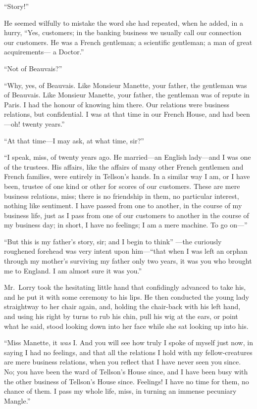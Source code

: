 ``Story!''

He seemed wilfully to mistake the word she had repeated, when he
added, in a hurry, ``Yes, customers; in the banking business we
usually call our connection our customers.  He was a French
gentleman; a scientific gentleman; a man of great acquirements---%
a Doctor.''

``Not of Beauvais?''

``Why, yes, of Beauvais.  Like Monsieur Manette, your father,
the gentleman was of Beauvais.  Like Monsieur Manette, your father,
the gentleman was of repute in Paris.  I had the honour of knowing
him there.  Our relations were business relations, but confidential.
I was at that time in our French House, and had been---oh! twenty years.''

``At that time---I may ask, at what time, sir?''

``I speak, miss, of twenty years ago.  He married---an English
lady---and I was one of the trustees.  His affairs, like the affairs
of many other French gentlemen and French families, were entirely in
Tellson's hands.  In a similar way I am, or I have been, trustee of
one kind or other for scores of our customers.  These are mere business
relations, miss; there is no friendship in them, no particular
interest, nothing like sentiment.  I have passed from one to another,
in the course of my business life, just as I pass from one of our
customers to another in the course of my business day; in short, I
have no feelings; I am a mere machine.  To go on---''

``But this is my father's story, sir; and I begin to think''%
---the curiously roughened forehead was very intent upon him---``that
when I was left an orphan through my mother's surviving my father
only two years, it was you who brought me to England.  I am almost
sure it was you.''

Mr.\ Lorry took the hesitating little hand that confidingly advanced
to take his, and he put it with some ceremony to his lips.  He then
conducted the young lady straightway to her chair again, and, holding
the chair-back with his left hand, and using his right by turns to
rub his chin, pull his wig at the ears, or point what he said, stood
looking down into her face while she sat looking up into his.

``Miss Manette, it \emph{was} I. And you will see how truly I spoke of
myself just now, in saying I had no feelings, and that all the
relations I hold with my fellow-creatures are mere business
relations, when you reflect that I have never seen you since.
No; you have been the ward of Tellson's House since, and I have been
busy with the other business of Tellson's House since.  Feelings!
I have no time for them, no chance of them.  I pass my whole life,
miss, in turning an immense pecuniary Mangle.''

